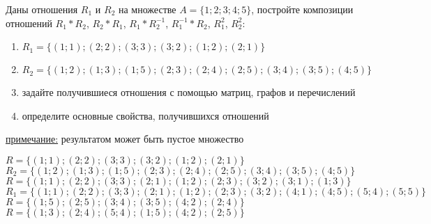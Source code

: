 \question
Даны отношения $R_1$ и $R_2$ на множестве $A = \{1; 2; 3; 4; 5\}$, постройте композиции отношений $R_1*R_2$, $R_2*R_1$,  $R_1*R_2^{-1}$, $R_1^{-1}*R_2$, $R_1^2$, $R_2^2$:
\begin{enumerate}
	\renewcommand{\labelenumi}{\alph{enumi})}
	\item $R_1 = \{(1; 1); (2; 2); (3; 3); (3; 2); (1; 2); (2; 1)\}$
	\item $R_2 = \{(1; 2); (1; 3); (1; 5); (2; 3); (2; 4); (2; 5); (3; 4); (3; 5); (4; 5)\}$
	\item задайте получившиеся отношения с помощью матриц, графов и перечислений 
	\item определите основные свойства, получившихся отношений
\end{enumerate}

\underline{примечание:} результатом может быть пустое множество




$R = \{(1; 1); (2; 2); (3; 3); (3; 2); (1; 2); (2; 1)\}$
$R_2 = \{(1; 2); (1; 3); (1; 5); (2; 3); (2; 4); (2; 5); (3; 4); (3; 5); (4; 5)\}$
$R = \{(1; 1); (2; 2); (3; 3); (2; 1); (1; 2); (2; 3); (3; 2); (3; 1); (1; 3)\}$
$R_1 = \{(1; 1); (2; 2); (3; 3); (2; 1); (1; 2); (2; 3); (3; 2); (4; 1); (4; 5); (5; 4); (5; 5)\}$
$R = \{(1; 5); (2; 5); (3; 4); (3; 5); (4; 2); (2; 4)\}$
$R = \{(1; 3); (2; 4); (5; 4); (1; 5); (4; 2); (2; 5)\}$